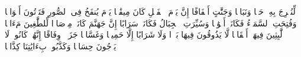 \startbuffer[\q:78:15]
لِّنُخۡرِجَ بِهِۦ حَبࣰّا وَنَبَاتࣰا%
\stopbuffer
\startbuffer[\q:78:16]
وَجَنَّٰتٍ أَلۡفَافًا%
\stopbuffer
\startbuffer[\q:78:17]
إِنَّ یَوۡمَ ٱلۡفَصۡلِ كَانَ مِیقَٰتࣰا%
\stopbuffer
\startbuffer[\q:78:18]
یَوۡمَ یُنفَخُ فِی ٱلصُّورِ فَتَأۡتُونَ أَفۡوَاجࣰا%
\stopbuffer
\startbuffer[\q:78:19]
وَفُتِحَتِ ٱلسَّمَاۤءُ فَكَانَتۡ أَبۡوَٰبࣰا%
\stopbuffer
\startbuffer[\q:78:20]
وَسُیِّرَتِ ٱلۡجِبَالُ فَكَانَتۡ سَرَابًا%
\stopbuffer
\startbuffer[\q:78:21]
إِنَّ جَهَنَّمَ كَانَتۡ مِرۡصَادࣰا%
\stopbuffer
\startbuffer[\q:78:22]
لِّلطَّٰغِینَ مَءَابࣰا%
\stopbuffer
\startbuffer[\q:78:23]
لَّٰبِثِینَ فِیهَاۤ أَحۡقَابࣰا%
\stopbuffer
\startbuffer[\q:78:24]
لَّا یَذُوقُونَ فِیهَا بَرۡدࣰا وَلَا شَرَابًا%
\stopbuffer
\startbuffer[\q:78:25]
إِلَّا حَمِیمࣰا وَغَسَّاقࣰا%
\stopbuffer
\startbuffer[\q:78:26]
جَزَاۤءࣰ وِفَاقًا%
\stopbuffer
\startbuffer[\q:78:27]
إِنَّهُمۡ كَانُوا۟ لَا یَرۡجُونَ حِسَابࣰا%
\stopbuffer
\startbuffer[\q:78:28]
وَكَذَّبُوا۟ بِءَایَٰتِنَا كِذَّابࣰا%
\stopbuffer
